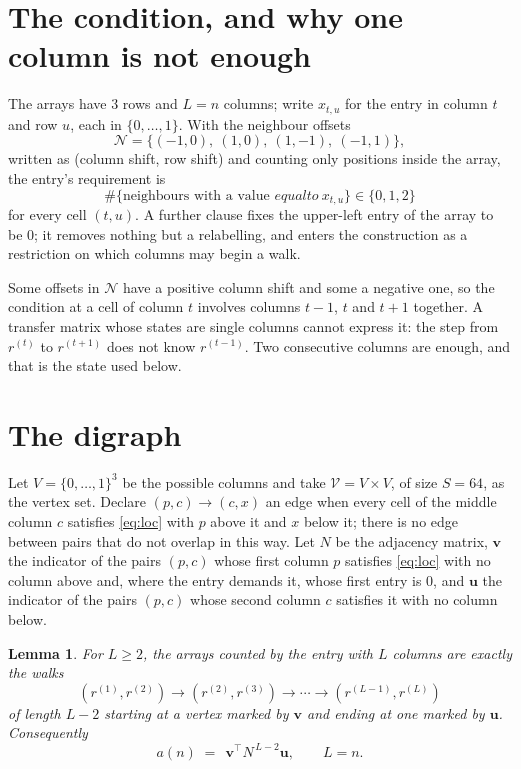 \documentclass[11pt,a4paper]{article}
\theoremstyle{plain}
\newtheorem{lemma}[theorem]{Lemma}
\theoremstyle{definition}
\begin{document}
\section{The condition, and why one column is not enough}

The arrays have $3$ rows and $L=n$ columns; write $x_{t,u}$ for the entry in
column $t$ and row $u$, each in $\{0,\dots,1\}$. With the neighbour offsets
\[
\mathcal N=\{(-1,0),\ (1,0),\ (1,-1),\ (-1,1)\},
\]
written as (column shift, row shift) and counting only positions inside the array, the
entry's requirement is
\begin{equation}\label{eq:loc}
\#\{\text{neighbours with a value }equal to\ x_{t,u}\}\in\{0,1,2\}
\end{equation}
for every cell $(t,u)$. A further clause fixes the upper-left entry of the array to be $0$; it removes nothing but a relabelling, and enters the construction as a restriction on which columns may begin a walk.

Some offsets in $\mathcal N$ have a positive column shift and some a negative one, so the
condition at a cell of column $t$ involves columns $t-1$, $t$ and $t+1$ together. A transfer
matrix whose states are single columns cannot express it: the step from $r^{(t)}$ to
$r^{(t+1)}$ does not know $r^{(t-1)}$. Two consecutive columns are enough, and that is
the state used below.

\section{The digraph}

Let $V=\{0,\dots,1\}^{3}$ be the possible columns and take
$\mathcal V=V\times V$, of size $S=64$, as the vertex set. Declare $(p,c)\to(c,x)$ an edge
when every cell of the middle column $c$ satisfies \eqref{eq:loc} with $p$ above it and $x$
below it; there is no edge between pairs that do not overlap in this way. Let $N$ be the
adjacency matrix, $\mathbf{v}$ the indicator of the pairs $(p,c)$ whose first column $p$
satisfies \eqref{eq:loc} with no column above and, where the entry demands it, whose first entry is $0$, and $\mathbf{u}$ the indicator of
the pairs $(p,c)$ whose second column $c$ satisfies it with no column below.

\begin{lemma}\label{lem:walk}
For $L\ge2$, the arrays counted by the entry with $L$ columns are exactly the walks
\[
(r^{(1)},r^{(2)})\to(r^{(2)},r^{(3)})\to\cdots\to(r^{(L-1)},r^{(L)})
\]
of length $L-2$ starting at a vertex marked by $\mathbf{v}$ and ending at one marked by
$\mathbf{u}$. Consequently
\[
a(n)\;=\;\,\mathbf{v}^{\!\top}N^{\,L-2}\mathbf{u},\qquad L=n .
\]
\end{lemma}
\end{document}
